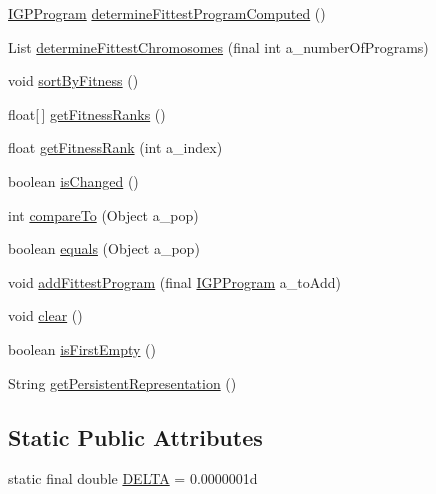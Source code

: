 \begin{DoxyCompactItemize}
\item 
\hyperlink{interfaceorg_1_1jgap_1_1gp_1_1_i_g_p_program}{I\-G\-P\-Program} \hyperlink{classorg_1_1jgap_1_1gp_1_1impl_1_1_g_p_population_a4086d0d89287220377311d23251e10ba}{determine\-Fittest\-Program\-Computed} ()
\item 
List \hyperlink{classorg_1_1jgap_1_1gp_1_1impl_1_1_g_p_population_afb008e4b0e98c45736c53eb82021f94c}{determine\-Fittest\-Chromosomes} (final int a\-\_\-number\-Of\-Programs)
\item 
void \hyperlink{classorg_1_1jgap_1_1gp_1_1impl_1_1_g_p_population_a0d7b58819ffefbefbc0baaa1d12a9cb6}{sort\-By\-Fitness} ()
\item 
float\mbox{[}$\,$\mbox{]} \hyperlink{classorg_1_1jgap_1_1gp_1_1impl_1_1_g_p_population_aa780fcbd721a87a70b46abbfab096e3c}{get\-Fitness\-Ranks} ()
\item 
float \hyperlink{classorg_1_1jgap_1_1gp_1_1impl_1_1_g_p_population_add444d666bfb69e116878039b634a4c1}{get\-Fitness\-Rank} (int a\-\_\-index)
\item 
boolean \hyperlink{classorg_1_1jgap_1_1gp_1_1impl_1_1_g_p_population_a1d9efd7c3d81d1e70168ef872e587142}{is\-Changed} ()
\item 
int \hyperlink{classorg_1_1jgap_1_1gp_1_1impl_1_1_g_p_population_a0e749981f33246815f8124532e3136c6}{compare\-To} (Object a\-\_\-pop)
\item 
boolean \hyperlink{classorg_1_1jgap_1_1gp_1_1impl_1_1_g_p_population_a45ced80a38dc1904286b4eb3ff52df96}{equals} (Object a\-\_\-pop)
\item 
void \hyperlink{classorg_1_1jgap_1_1gp_1_1impl_1_1_g_p_population_a28f3cef918cd1f82d3613d93f6e0e4e9}{add\-Fittest\-Program} (final \hyperlink{interfaceorg_1_1jgap_1_1gp_1_1_i_g_p_program}{I\-G\-P\-Program} a\-\_\-to\-Add)
\item 
void \hyperlink{classorg_1_1jgap_1_1gp_1_1impl_1_1_g_p_population_a815c413fb2bdd4b2b9c404868ee0426e}{clear} ()
\item 
boolean \hyperlink{classorg_1_1jgap_1_1gp_1_1impl_1_1_g_p_population_aae705ed824ebf7c7bf152f7998158239}{is\-First\-Empty} ()
\item 
String \hyperlink{classorg_1_1jgap_1_1gp_1_1impl_1_1_g_p_population_a9cdf68c27b023404e7c51b02ef2ec756}{get\-Persistent\-Representation} ()
\end{DoxyCompactItemize}
\subsection*{Static Public Attributes}
\begin{DoxyCompactItemize}
\item 
static final double \hyperlink{classorg_1_1jgap_1_1gp_1_1impl_1_1_g_p_population_ab8c06531dff207ecdff0c86b3d36651e}{D\-E\-L\-T\-A} = 0.\-0000001d
\end{DoxyCompactItemize}
